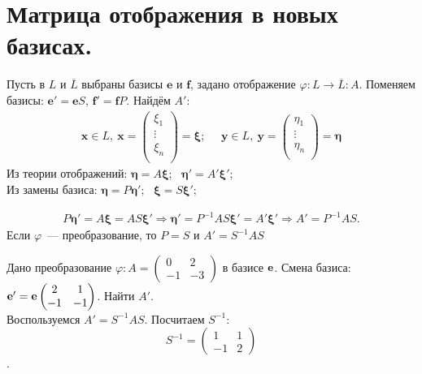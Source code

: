  \section{Матрица отображения в новых базисах.}
Пусть в $L$ и $\overline L$ выбраны базисы $\textbf{e}$ и $\textbf{f}$, задано отображение $\varphi\colon L \to \overline L : A$.
Поменяем базисы: $ \textbf{e}' = \textbf{e} S$, $ \textbf{f}' = \textbf{f} P$.
Найдём $A'$:\\
\begin{gather*}
\textbf{x} \in L,~ \textbf{x}=\left(\begin{smallmatrix}
\xi_1 \\ \vdots\\ \xi_n\\
\end{smallmatrix} \right)=\bm{\xi};~~~~~~
\textbf{y} \in L,~ \textbf{y}=\left(\begin{smallmatrix}
\eta_1 \\ \vdots\\ \eta_n\\
\end{smallmatrix} \right)=\bm{\eta}
\end{gather*}
Из теории отображений: $\bm{\eta} = A \bm{\xi};~~~\bm{\eta}' = A' \bm{\xi}';$\\
Из замены базиса: $	\bm{\eta} = P \bm{\eta}';~~~	\bm{\xi} = S \bm\xi';$

\begin{gather*}
	P \bm \eta' = A \bm \xi = AS \bm\xi'
\Rightarrow
	\bm\eta' = P^{-1} A S \bm\xi'=A' \bm \xi'
\Rightarrow
	\boxed{A' = P^{-1} A S.}
\end{gather*}
Если $\varphi$~--- преобразование, то $P=S$ и $A'=S^{-1}AS$\\

\begin{prim} 
	Дано преобразование $\varphi\colon A = \begin{pmatrix} 0 & 2 \\ -1 & -3 \end{pmatrix}$ в базисе $\bf e$. Смена базиса: $\bf e' = \bf e \begin{pmatrix} 2 & 1 \\ -1 & -1 \end{pmatrix}$.
Найти $A'$.\\

Воспользуемся $A'=S^{-1}AS$. Посчитаем $S^{-1}$:\\
$$S^{-1} =
\begin{pmatrix} 1 & 1 \\ -1 & 2 \end{pmatrix}$$.
\end{prim}